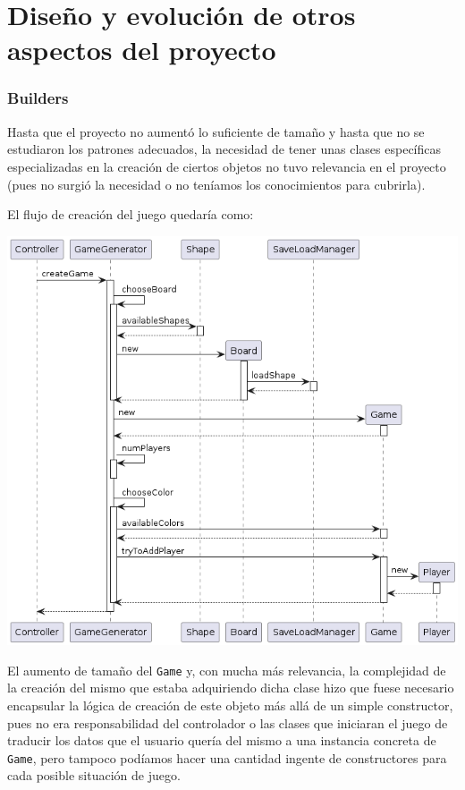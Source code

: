 \documentclass[../DocumentoOficial.tex]{subfiles}
\begin{document}
\chapter{Diseño y evolución de otros aspectos del proyecto}

\subsection{Builders}
Hasta que el proyecto no aumentó lo suficiente de tamaño y hasta que no se estudiaron los patrones adecuados, la necesidad de tener unas clases específicas especializadas en la creación de ciertos objetos no tuvo relevancia en el proyecto (pues no surgió la necesidad o no teníamos los conocimientos para cubrirla).

\begin{sprint}[3]
El flujo de creación del juego quedaría como:
\begin{center}
\includegraphics[scale=0.5]{Builders_sprint3_seq}
\end{center}

El aumento de tamaño del \texttt{Game} y, con mucha más relevancia, la complejidad de la creación del mismo que estaba adquiriendo dicha clase hizo que fuese necesario encapsular la lógica de creación de este objeto más allá de un simple constructor, pues no era responsabilidad del controlador o las clases que iniciaran el juego de traducir los datos que el usuario quería del mismo a una instancia concreta de \texttt{Game}, pero tampoco podíamos hacer una cantidad ingente de constructores para cada posible situación de juego.


\end{sprint}
\end{document}
